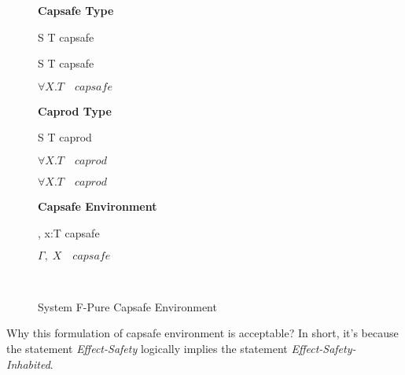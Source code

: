 \begin{figure}[h]
\begin{framed}

\setlength{\columnseprule}{0.4pt}
\begin{multicols}{2}

\textbf{Capsafe Type}



{ S \to T \quad capsafe }

{ S \to T \quad capsafe }

{ \colorbox{shade}{$\forall X.T \quad capsafe$} }

\columnbreak

\textbf{Caprod Type}


{ S \to T \quad caprod }

{ \colorbox{shade}{$\forall X.T \quad caprod$} }

{ \colorbox{shade}{$\forall X.T \quad caprod$} }

\textbf{Capsafe Environment}


{ \Gamma, \; x:T \quad capsafe }

{ \colorbox{shade}{$\Gamma, \; X \quad capsafe$} }

\hfill\\

\end{multicols}
\end{framed}

\caption{System F-Pure Capsafe Environment}
\label{fig:f-pure-capsafe-definition}
\end{figure}

Why this formulation of capsafe environment is acceptable? In short,
it's because the statement \emph{Effect-Safety} logically implies the
statement \emph{Effect-Safety-Inhabited}.

